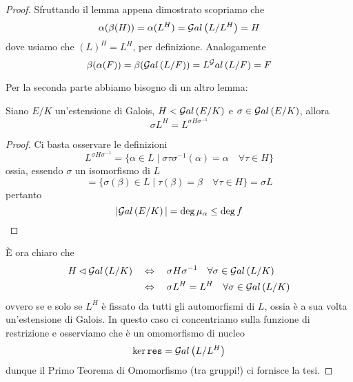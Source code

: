 \begin{multicols}{2}
\begin{proof}
	Sfruttando il lemma appena dimostrato scopriamo che
	\[ \alpha(\beta(H)) = \alpha(L^H) = \mathcal{G}al\left( L/L^H \right) = H \]
	dove usiamo che $ (L)^H = L^H $, per definizione. Analogamente
	\[ \beta(\alpha(F)) = \beta(\mathcal{G}al\left( L/F \right)) = L^\mathcal{G}al\left( L/F \right) = F \] 
	
	Per la seconda parte abbiamo bisogno di un altro lemma:
	\begin{prop}
		Siano $ E/K $ un'estensione di Galois, $ H < \mathcal{G}al\left( E/K \right) $ e $ \sigma \in \mathcal{G}al\left( E/K \right) $, allora
		\[ \sigma L^H = L^{\sigma H \sigma^{-1}} \]
	\end{prop}
	\begin{proof}
		Ci basta osservare le definizioni
		\[ L^{\sigma H \sigma^{-1}} = \{ \alpha \in L \mid \sigma\tau\sigma^{-1}(\alpha) = \alpha \quad\forall \tau \in H \} \]
		ossia, essendo $ \sigma $ un isomorfismo di $ L $
		\[ = \{ \sigma(\beta) \in L \mid \tau(\beta) = \beta \quad\forall \tau \in H \} = \sigma L \]
		pertanto
		\[ |\mathcal{G}al\left( E/K \right)| = \deg\mu_\alpha \leq \deg f \]
	\end{proof}
	\`{E} ora chiaro che
	\begin{align*}
		H \lhd \mathcal{G}al\left( L/K \right) &\quad\Leftrightarrow\quad \sigma H \sigma^{-1} \quad \forall\sigma \in \mathcal{G}al\left( L/K \right) \\
		& \quad\Leftrightarrow\quad \sigma L^H = L^H \quad \forall\sigma \in \mathcal{G}al\left( L/K \right)
	\end{align*}
	ovvero se e solo se $ L^H $ è fissato da tutti gli automorfismi di $ L $, ossia è a sua volta un'estensione di Galois.
	In questo caso ci concentriamo sulla funzione di restrizione
	e osserviamo che è un omomorfismo di nucleo
	\[ \ker \texttt{res} = \mathcal{G}al\left( L/L^H \right) \]
	dunque il Primo Teorema di Omomorfismo (tra gruppi!) ci fornisce la tesi.
	\end{proof}
	
	
\end{multicols}

